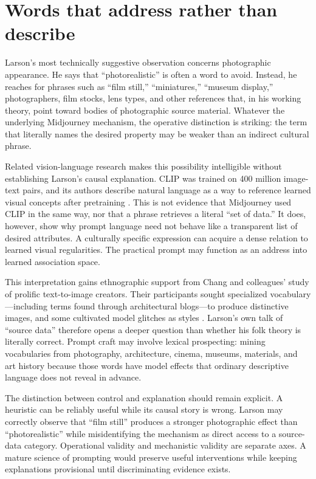 \documentclass[11pt]{article}
\begin{document}
\section{Words that address rather than describe}
Larson’s most technically suggestive observation concerns photographic appearance. He says that ``photorealistic'' is often a word to avoid. Instead, he reaches for phrases such as ``film still,'' ``miniatures,'' ``museum display,'' photographers, film stocks, lens types, and other references that, in his working theory, point toward bodies of photographic source material. Whatever the underlying Midjourney mechanism, the operative distinction is striking: the term that literally names the desired property may be weaker than an indirect cultural phrase.

Related vision-language research makes this possibility intelligible without establishing Larson’s causal explanation. CLIP was trained on 400 million image-text pairs, and its authors describe natural language as a way to reference learned visual concepts after pretraining \cite{RadfordEtAl2021}. This is not evidence that Midjourney used CLIP in the same way, nor that a phrase retrieves a literal ``set of data.'' It does, however, show why prompt language need not behave like a transparent list of desired attributes. A culturally specific expression can acquire a dense relation to learned visual regularities. The practical prompt may function as an address into learned association space.

This interpretation gains ethnographic support from Chang and colleagues’ study of prolific text-to-image creators. Their participants sought specialized vocabulary—including terms found through architectural blogs—to produce distinctive images, and some cultivated model glitches as styles \cite{ChangEtAl2023PromptArtists}. Larson’s own talk of ``source data'' therefore opens a deeper question than whether his folk theory is literally correct. Prompt craft may involve lexical prospecting: mining vocabularies from photography, architecture, cinema, museums, materials, and art history because those words have model effects that ordinary descriptive language does not reveal in advance.

The distinction between control and explanation should remain explicit. A heuristic can be reliably useful while its causal story is wrong. Larson may correctly observe that ``film still'' produces a stronger photographic effect than ``photorealistic'' while misidentifying the mechanism as direct access to a source-data category. Operational validity and mechanistic validity are separate axes. A mature science of prompting would preserve useful interventions while keeping explanations provisional until discriminating evidence exists.
\end{document}
